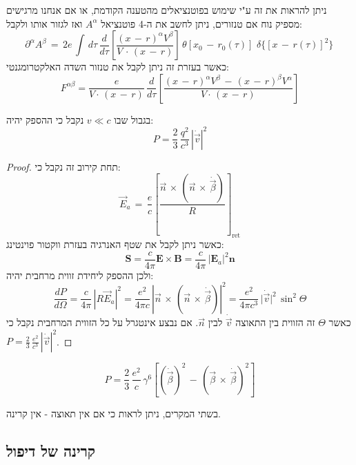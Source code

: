 \documentclass{tstextbook}
\begin{document}
ניתן להראות את זה ע"י שימוש בפוטנציאלים מהטענה הקודמת, או אם אנחנו מרגישים מספיק נוח אם טנזורים, ניתן לחשב את ה-4 פוטנציאל \(A^{\alpha}\) ואז לגזור אותו ולקבל:
$$\partial^{\alpha}A^{\beta}\,=\,2e\,\int\,d\tau\,\frac{d}{d\tau}\left[\frac{(x\,-\,r)^{\alpha}V^{\beta}}{V\,\cdot\,(x\,-\,r)}\right]\,\theta[x_{0}\,-\,r_{0}(\tau)]\,\,\delta\{[x\,-\,r(\tau)]^{2}\}\,$$
כאשר בעזרת זה ניתן לקבל את טנזור השדה האלקטרומגנטי:
$$F^{\alpha\beta}=\frac{e}{V\cdot\,(x\,-\,r)}\,\frac{d}{d\tau}\left[\frac{(x\,-\,r)^{\alpha}V^{\beta}\,-\,(x\,-\,r)^{\beta}V^{\alpha}}{V\cdot\,(x\,-\,r)}\right]$$

\begin{proposition}
בגבול שבו \(v\ll c\) נקבל כי ההספק יהיה:
$$P={\frac{2}{3}}\,{\frac{q^{2}}{c^{3}}}\,|{\dot{\vec{v}}}|^{2}$$

\end{proposition}
\begin{proof}
תחת קירוב זה נקבל כי:
$$\vec{E}_{a}\,=\,{\frac{e}{c}}\left[{\frac{\vec{n}\,\times\,(\vec{n}\,\times\,{\dot{\vec{\beta}}})}{R}}\right]_{\mathrm{ret}}$$
כאשר ניתן לקבל את שטף האנרגיה בעזרת ווקטור פוינטינג:
$${\textbf{S}}={\frac{c}{4\pi}}{\textbf{E}}\times{\textbf{B}}={\frac{c}{4\pi}}\,|{\textbf{E}}_{a}|^{2}{\textbf{n}}$$
ולכן ההספק ליחידת זווית מרחבית יהיה:
$$\frac{d P}{d\Omega}=\frac{c}{4\pi}\,|R{\vec E}_{a}|^{2}=\frac{e^{2}}{4\pi c}\,|{\vec n}\,\times\,({\vec n}\,\times\,{\dot{\vec\beta}})|^{2}={\frac{e^{2}}{4\pi c^{3}}}\,\vert{\dot{\vec{v}}}\vert^{2}\,\sin^{2}\!\Theta$$
כאשר \(\Theta\) זה הזווית בין התאוצה \(\dot{\vec{v}}\) לבין \(\vec{n}\). אם נבצע אינטגרל על כל הזווית המרחבית נקבל כי \(P={\frac{2}{3}}\,{\frac{e^{2}}{c^{3}}}\,|{\dot{\vec{v}}}|^{2}\).

\end{proof}
\begin{proposition}
$$P=\frac{2}{3}\,\frac{e^{2}}{c}\,\gamma^{6}[(\dot{\vec\beta})^{2}\,-\,({\vec\beta}\,\times\,\dot{\vec\beta})^{2}]$$

\end{proposition}
\begin{remark}
בשתי המקרים, ניתן לראות כי אם אין תאוצה - אין קרינה.

\end{remark}
\subsection{קרינה של דיפול}
\end{document}
